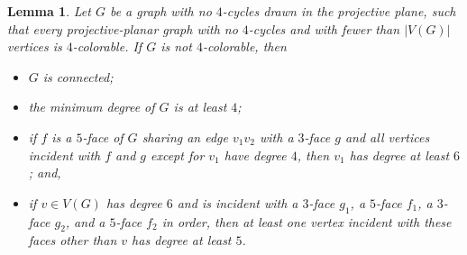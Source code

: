 \documentclass[12pt,twoside,openright,a4paper]{book}
\newtheorem{lemma}[theorem]{Lemma}
\begin{document}
\begin{lemma}\label{lemma:no4cproj-redu}
Let $G$ be a graph with no $4$-cycles drawn in the projective plane, such that every projective-planar graph
with no $4$-cycles and with fewer than $|V(G)|$ vertices is $4$-colorable.  If $G$ is not $4$-colorable, then
\begin{itemize}
\item[\textrm{(a)}] $G$ is connected;
\item[\textrm{(b)}] the minimum degree of $G$ is at least $4$;
\item[\textrm{(c)}] if $f$ is a $5$-face of $G$ sharing an edge $v_1v_2$ with a $3$-face $g$ and all vertices
incident with $f$ and $g$ except for $v_1$ have degree $4$, then $v_1$ has degree at least $6$; and,
\item[\textrm{(d)}] if $v\in V(G)$ has degree $6$ and is incident with a $3$-face $g_1$, a $5$-face $f_1$,
a $3$-face $g_2$, and a $5$-face $f_2$ in order, then at least one vertex incident with these faces other than $v$ has
degree at least $5$.
\end{itemize}
\end{lemma}
\end{document}

